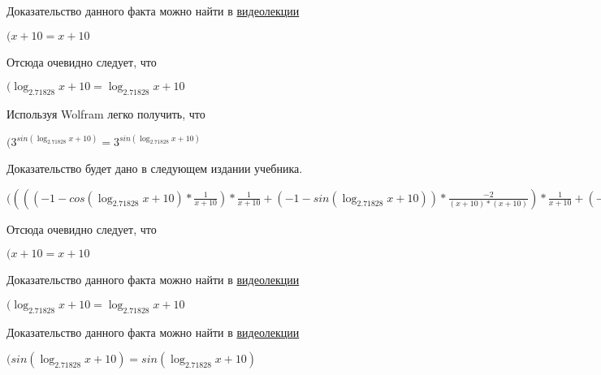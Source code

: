 \documentclass[12pt,a4paper,fleqn]{article}
\theoremstyle{definition}
\begin{document}
Доказательство данного факта можно найти в \href{https://www.youtube.com/watch?v=dQw4w9WgXcQ}{видеолекции}

$( x  +  10  =  x  +  10 $

Отсюда очевидно следует, что

$(\log_{ 2.71828 }{ x  +  10 } = \log_{ 2.71828 }{ x  +  10 }$

Используя Wolfram легко получить, что

$({ 3 }^{sin(\log_{ 2.71828 }{ x  +  10 })} = { 3 }^{sin(\log_{ 2.71828 }{ x  +  10 })}$

Доказательство будет дано в следующем издании учебника.

$(((( -1  - cos(\log_{ 2.71828 }{ x  +  10 }) * \frac{ 1 }{ x  +  10 }
) * \frac{ 1 }{ x  +  10 }
 + ( -1  - sin(\log_{ 2.71828 }{ x  +  10 })) * \frac{ -2 }{( x  +  10 ) * ( x  +  10 )}
) * \frac{ 1 }{ x  +  10 }
 + ( -1  - sin(\log_{ 2.71828 }{ x  +  10 })) * \frac{ 1 }{ x  +  10 }
 * \frac{ -2 }{( x  +  10 ) * ( x  +  10 )}
 + ( -1  - sin(\log_{ 2.71828 }{ x  +  10 })) * \frac{ 1 }{ x  +  10 }
 * \frac{ -2 }{( x  +  10 ) * ( x  +  10 )}
 + cos(\log_{ 2.71828 }{ x  +  10 }) * \frac{ -1  -  -2  * ( x  +  10  +  x  +  10 )}{( x  +  10 ) * ( x  +  10 ) * ( x  +  10 ) * ( x  +  10 )}
) * { 3 }^{sin(\log_{ 2.71828 }{ x  +  10 })} = ((( -1  - cos(\log_{ 2.71828 }{ x  +  10 }) * \frac{ 1 }{ x  +  10 }
) * \frac{ 1 }{ x  +  10 }
 + ( -1  - sin(\log_{ 2.71828 }{ x  +  10 })) * \frac{ -2 }{( x  +  10 ) * ( x  +  10 )}
) * \frac{ 1 }{ x  +  10 }
 + ( -1  - sin(\log_{ 2.71828 }{ x  +  10 })) * \frac{ 1 }{ x  +  10 }
 * \frac{ -2 }{( x  +  10 ) * ( x  +  10 )}
 + ( -1  - sin(\log_{ 2.71828 }{ x  +  10 })) * \frac{ 1 }{ x  +  10 }
 * \frac{ -2 }{( x  +  10 ) * ( x  +  10 )}
 + cos(\log_{ 2.71828 }{ x  +  10 }) * \frac{ -1  -  -2  * ( x  +  10  +  x  +  10 )}{( x  +  10 ) * ( x  +  10 ) * ( x  +  10 ) * ( x  +  10 )}
) * { 3 }^{sin(\log_{ 2.71828 }{ x  +  10 })}$

Отсюда очевидно следует, что

$( x  +  10  =  x  +  10 $

Доказательство данного факта можно найти в \href{https://www.youtube.com/watch?v=dQw4w9WgXcQ}{видеолекции}

$(\log_{ 2.71828 }{ x  +  10 } = \log_{ 2.71828 }{ x  +  10 }$

Доказательство данного факта можно найти в \href{https://www.youtube.com/watch?v=dQw4w9WgXcQ}{видеолекции}

$(sin(\log_{ 2.71828 }{ x  +  10 }) = sin(\log_{ 2.71828 }{ x  +  10 })$
\end{document}
